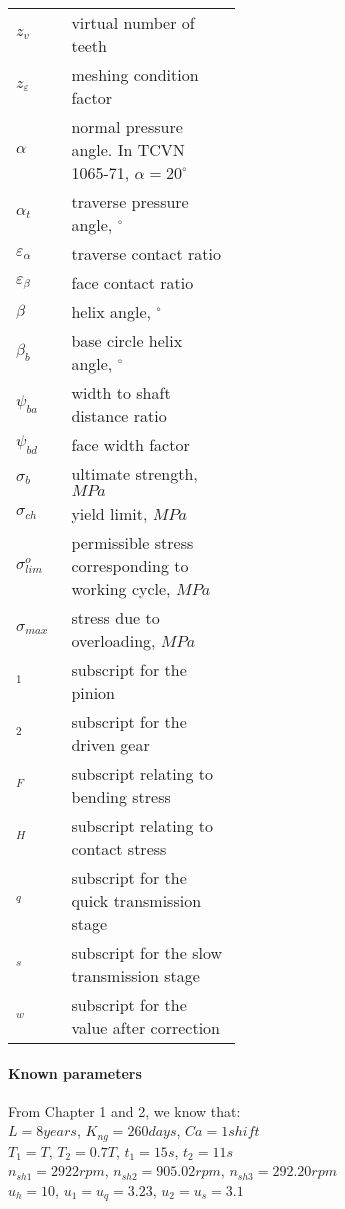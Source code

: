 \begin{tabular}[t]{p{0.05\linewidth}p{0.4\linewidth}}
	
	$ z_v $ & virtual number of teeth\\
	$ z_\varepsilon $ & meshing condition factor\\
	$ \alpha $ & normal pressure angle. In TCVN 1065-71, $ \alpha = 20^\circ $\\
	$ \alpha_t $ & traverse pressure angle, $ ^\circ $\\
	$ \varepsilon_\alpha $ & traverse contact ratio\\
	$ \varepsilon_\beta $ & face contact ratio\\
	$ \beta $ & helix angle, $ ^\circ $\\
	$ \beta_b $ & base circle helix angle, $ ^\circ $\\
	$ \psi_{ba} $ & width to shaft distance ratio\\
	$ \psi_{bd} $ & face width factor \\
	$ \sigma_b $ & ultimate strength, $ \unit{MPa} $\\
	$ \sigma_{ch} $ & yield limit, $ \unit{MPa} $\\
	$ \sigma_{lim}^o $ & permissible stress corresponding to working cycle, $ \unit{MPa} $\\
	$ \sigma_{max} $ & stress due to overloading, $ \unit{MPa} $ \\
	$ _{1} $ & subscript for the pinion \\
	$ _{2} $ & subscript for the driven gear\\
	$ _F $ & subscript relating to bending stress\\
	$ _H $ & subscript relating to contact stress\\
	$ _q $ & subscript for the quick transmission stage\\
	$ _s $ & subscript for the slow transmission stage\\
	$ _w $ & subscript for the value after correction\\
\end{tabular}


\paragraph{Known parameters} From Chapter 1 and 2, we know that:\\
$ L=8\unit{years} $, $ K_{ng}=260\unit{days} $, $ Ca=1\unit{shift} $\\
$ T_1=T$, $T_2=0.7T$, $ t_1=15\unit{s}$, $t_2=11\unit{s} $\\
$ n_{sh1}=2922\unit{rpm} $, $ n_{sh2}=905.02\unit{rpm} $, $ n_{sh3}=292.20\unit{rpm} $\\
$ u_h=10 $, $ u_1 =u_q=3.23$, $ u_2=u_s=3.1 $


